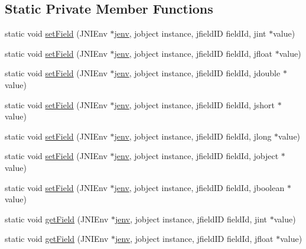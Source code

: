 \subsection*{Static Private Member Functions}
\begin{DoxyCompactItemize}
\item 
static void \hyperlink{class_j_n_i_helper_a8265ea28e2311aac6a66a2b794b4a8fe}{set\-Field} (J\-N\-I\-Env $\ast$\hyperlink{aparapi_8cpp_a31595c73e9a3750524b2ff61b5a14f96}{jenv}, jobject instance, jfield\-I\-D field\-Id, jint $\ast$value)
\item 
static void \hyperlink{class_j_n_i_helper_a6a24cbc36c6c00c8062735b872c9ddb5}{set\-Field} (J\-N\-I\-Env $\ast$\hyperlink{aparapi_8cpp_a31595c73e9a3750524b2ff61b5a14f96}{jenv}, jobject instance, jfield\-I\-D field\-Id, jfloat $\ast$value)
\item 
static void \hyperlink{class_j_n_i_helper_a91745290d3dbba0bc0e899a2e4cbb0b3}{set\-Field} (J\-N\-I\-Env $\ast$\hyperlink{aparapi_8cpp_a31595c73e9a3750524b2ff61b5a14f96}{jenv}, jobject instance, jfield\-I\-D field\-Id, jdouble $\ast$value)
\item 
static void \hyperlink{class_j_n_i_helper_a707937851d5e36013feb79dd29e79978}{set\-Field} (J\-N\-I\-Env $\ast$\hyperlink{aparapi_8cpp_a31595c73e9a3750524b2ff61b5a14f96}{jenv}, jobject instance, jfield\-I\-D field\-Id, jshort $\ast$value)
\item 
static void \hyperlink{class_j_n_i_helper_ae1272f3e616aed8c1ba6ba775e73dc7d}{set\-Field} (J\-N\-I\-Env $\ast$\hyperlink{aparapi_8cpp_a31595c73e9a3750524b2ff61b5a14f96}{jenv}, jobject instance, jfield\-I\-D field\-Id, jlong $\ast$value)
\item 
static void \hyperlink{class_j_n_i_helper_a135376558da387f45f147c1d32cd5c21}{set\-Field} (J\-N\-I\-Env $\ast$\hyperlink{aparapi_8cpp_a31595c73e9a3750524b2ff61b5a14f96}{jenv}, jobject instance, jfield\-I\-D field\-Id, jobject $\ast$value)
\item 
static void \hyperlink{class_j_n_i_helper_a53481dbf082667c76aff43e32e90bdf6}{set\-Field} (J\-N\-I\-Env $\ast$\hyperlink{aparapi_8cpp_a31595c73e9a3750524b2ff61b5a14f96}{jenv}, jobject instance, jfield\-I\-D field\-Id, jboolean $\ast$value)
\item 
static void \hyperlink{class_j_n_i_helper_ad389729ad0900ed6f3ccc7a105e42c9a}{get\-Field} (J\-N\-I\-Env $\ast$\hyperlink{aparapi_8cpp_a31595c73e9a3750524b2ff61b5a14f96}{jenv}, jobject instance, jfield\-I\-D field\-Id, jint $\ast$value)
\item 
static void \hyperlink{class_j_n_i_helper_aca90dfc2fcb39564f82a66cf01a8d4f6}{get\-Field} (J\-N\-I\-Env $\ast$\hyperlink{aparapi_8cpp_a31595c73e9a3750524b2ff61b5a14f96}{jenv}, jobject instance, jfield\-I\-D field\-Id, jfloat $\ast$value)

\end{DoxyCompactItemize}
